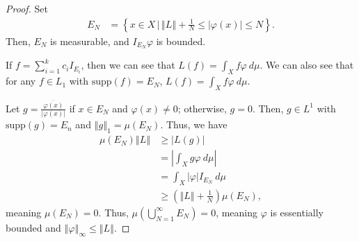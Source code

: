 \documentclass[10pt]{extarticle}
\newcommand{\norm}[1]{\left\Vert #1\right\Vert}
\newcommand{\set}[1]{\left\{#1\right\}}
\theoremstyle{plain}
\theoremstyle{definition}
\theoremstyle{note}
\renewcommand{\newline}{\hfill\break}
\begin{document}
\begin{proof}
  Set
  \begin{align*}
    E_N &= \set{x\in X\,\bigg|\,\norm{L} + \frac{1}{N} \leq \left\vert \varphi(x) \right\vert \leq N}.
  \end{align*}
  Then, $E_N$ is measurable, and $I_{E_N} \varphi$ is bounded.\newline

  If $f = \sum_{i=1}^{k}c_iI_{E_i}$, then we can see that $L(f) = \int_{X}f\varphi\:d\mu$. We can also see that for any $f\in L_1$ with $\text{supp}(f) = E_N$, $L(f) = \int_{X}f\varphi\:d\mu$.\newline

  Let $g = \frac{\overline{\varphi(x)}}{\left\vert \varphi(x) \right\vert}$ if $x\in E_N$ and $\varphi(x) \neq 0$; otherwise, $g = 0$. Then, $g\in L^1$ with $\text{supp}(g) = E_n$ and $\norm{g}_{1} = \mu(E_N)$. Thus, we have
  \begin{align*}
    \mu(E_N)\norm{L} &\geq \left\vert L(g) \right\vert\\
                     &= \left\vert \int_{X}^{} g\varphi\:d\mu \right\vert\\
                     &= \int_{X}^{} \left\vert \varphi \right\vert I_{E_N}\:d\mu\\
                     &\geq \left(\norm{L} + \frac{1}{N}\right)\mu\left(E_N\right),
  \end{align*}
  meaning $\mu(E_N) = 0$. Thus, $\mu\left(\bigcup_{N=1}^{\infty}E_N\right) = 0$, meaning $\varphi$ is essentially bounded and $\norm{\varphi}_{\infty}\leq \norm{L}$.
\end{proof}
\end{document}
